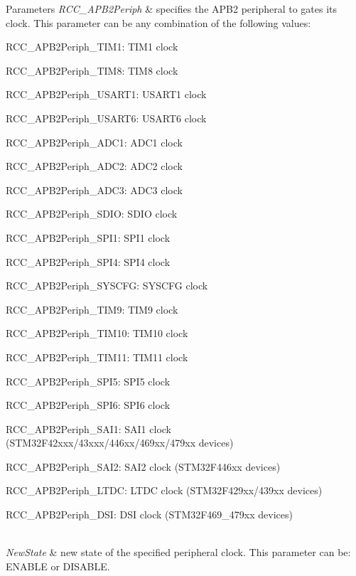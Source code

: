 \begin{DoxyParams}{Parameters}
{\em R\+C\+C\+\_\+\+A\+P\+B2\+Periph} & specifies the A\+P\+B2 peripheral to gates its clock. This parameter can be any combination of the following values\+: \begin{DoxyItemize}
\item R\+C\+C\+\_\+\+A\+P\+B2\+Periph\+\_\+\+T\+I\+M1\+: T\+I\+M1 clock \item R\+C\+C\+\_\+\+A\+P\+B2\+Periph\+\_\+\+T\+I\+M8\+: T\+I\+M8 clock \item R\+C\+C\+\_\+\+A\+P\+B2\+Periph\+\_\+\+U\+S\+A\+R\+T1\+: U\+S\+A\+R\+T1 clock \item R\+C\+C\+\_\+\+A\+P\+B2\+Periph\+\_\+\+U\+S\+A\+R\+T6\+: U\+S\+A\+R\+T6 clock \item R\+C\+C\+\_\+\+A\+P\+B2\+Periph\+\_\+\+A\+D\+C1\+: A\+D\+C1 clock \item R\+C\+C\+\_\+\+A\+P\+B2\+Periph\+\_\+\+A\+D\+C2\+: A\+D\+C2 clock \item R\+C\+C\+\_\+\+A\+P\+B2\+Periph\+\_\+\+A\+D\+C3\+: A\+D\+C3 clock \item R\+C\+C\+\_\+\+A\+P\+B2\+Periph\+\_\+\+S\+D\+IO\+: S\+D\+IO clock \item R\+C\+C\+\_\+\+A\+P\+B2\+Periph\+\_\+\+S\+P\+I1\+: S\+P\+I1 clock \item R\+C\+C\+\_\+\+A\+P\+B2\+Periph\+\_\+\+S\+P\+I4\+: S\+P\+I4 clock \item R\+C\+C\+\_\+\+A\+P\+B2\+Periph\+\_\+\+S\+Y\+S\+C\+FG\+: S\+Y\+S\+C\+FG clock \item R\+C\+C\+\_\+\+A\+P\+B2\+Periph\+\_\+\+T\+I\+M9\+: T\+I\+M9 clock \item R\+C\+C\+\_\+\+A\+P\+B2\+Periph\+\_\+\+T\+I\+M10\+: T\+I\+M10 clock \item R\+C\+C\+\_\+\+A\+P\+B2\+Periph\+\_\+\+T\+I\+M11\+: T\+I\+M11 clock \item R\+C\+C\+\_\+\+A\+P\+B2\+Periph\+\_\+\+S\+P\+I5\+: S\+P\+I5 clock \item R\+C\+C\+\_\+\+A\+P\+B2\+Periph\+\_\+\+S\+P\+I6\+: S\+P\+I6 clock \item R\+C\+C\+\_\+\+A\+P\+B2\+Periph\+\_\+\+S\+A\+I1\+: S\+A\+I1 clock (S\+T\+M32\+F42xxx/43xxx/446xx/469xx/479xx devices) \item R\+C\+C\+\_\+\+A\+P\+B2\+Periph\+\_\+\+S\+A\+I2\+: S\+A\+I2 clock (S\+T\+M32\+F446xx devices) \item R\+C\+C\+\_\+\+A\+P\+B2\+Periph\+\_\+\+L\+T\+DC\+: L\+T\+DC clock (S\+T\+M32\+F429xx/439xx devices) \item R\+C\+C\+\_\+\+A\+P\+B2\+Periph\+\_\+\+D\+SI\+: D\+SI clock (S\+T\+M32\+F469\+\_\+479xx devices) \end{DoxyItemize}
\\
\hline
{\em New\+State} & new state of the specified peripheral clock. This parameter can be\+: E\+N\+A\+B\+LE or D\+I\+S\+A\+B\+LE. \\
\hline
\end{DoxyParams}


